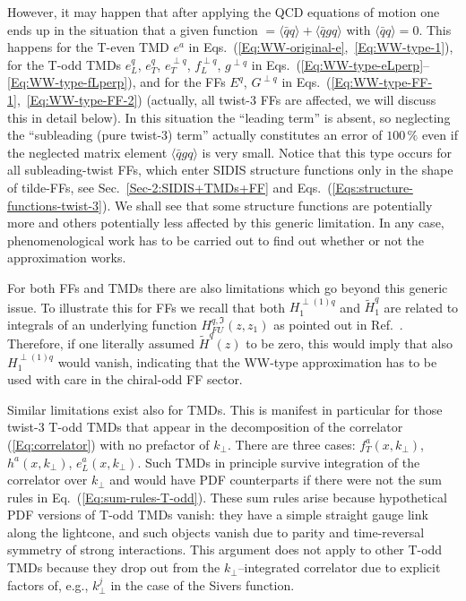 \documentclass[a4paper,11pt]{article}
\newcommand{\la}{\langle}
\newcommand{\ra}{\rangle}
\def\kperp{k_\perp}
\begin{document}
However, it may happen that after applying the QCD equations
of motion one ends up in the situation that a given function
$=\la\bar{q}q\ra + \la\bar{q}gq\ra$ with $\la\bar{q}q\ra = 0$.
This happens for the T-even TMD
	$e^a$ in Eqs.~(\ref{Eq:WW-original-e},~\ref{Eq:WW-type-1}),
for the T-odd TMDs
	$e_L^q$,
	$e_T^q$,
	$e_T^{\perp q}$,
	$f_L^{\perp q}$,
	$g^{\perp q}$ in Eqs.~(\ref{Eq:WW-type-eLperp}--\ref{Eq:WW-type-fLperp}),
and for the FFs
	$E^q$,
	$G^{\perp q}$ in Eqs.~(\ref{Eq:WW-type-FF-1},~\ref{Eq:WW-type-FF-2})
(actually, all twist-3 FFs are affected, we will discuss this in detail below).
In this situation the ``leading term'' is absent, so neglecting the
``subleading (pure twist-3) term'' actually constitutes an error of $100\,\%$
even if the neglected matrix element  $\la\bar{q}gq\ra$ is very small.
Notice that this type occurs for all subleading-twist FFs, which enter
SIDIS structure functions only in the shape of tilde-FFs, see
Sec.~\ref{Sec-2:SIDIS+TMDs+FF} and
Eqs.~(\ref{Eqs:structure-functions-twist-3}).
We shall see that some structure functions are potentially more and
others potentially less affected by this generic limitation. In any
case, phenomenological work has to be carried out to find out whether
or not the approximation works.


For both FFs and TMDs there are also limitations
which go beyond this generic issue. To illustrate this for FFs
we recall that both $H_1^{\perp(1)q}$ and $\tilde H_1^{q}$ are
related to integrals of an underlying function $H_{FU}^{q,\Im}(z,z_1)$
as pointed out in Ref.~\cite{Kanazawa:2015ajw}. Therefore, if one
literally assumed $\tilde H^q(z)$ to be zero, this would imply that
also $H_1^{\perp(1)q}$ would vanish, indicating that the WW-type
approximation has to be used with care in the chiral-odd FF sector.

Similar limitations exist also for TMDs. This is manifest in particular
for those twist-3 T-odd TMDs that appear in the decomposition of the
correlator (\ref{Eq:correlator}) with no prefactor of $\kperp$.
There are three cases: $f_T^a(x,k_\perp)$, $h^a(x,\kperp)$, $e_L^a(x,\kperp)$.
Such TMDs in principle survive integration of the correlator over $\kperp$
and would have PDF counterparts if there were not the sum rules in
Eq.~(\ref{Eq:sum-rules-T-odd}). These sum rules arise because hypothetical
PDF versions of T-odd TMDs vanish: they have a simple straight gauge link
along the lightcone, and such objects vanish due to parity and time-reversal
symmetry of strong interactions. This argument does not apply to other T-odd
TMDs because they drop out from the $\kperp$--integrated correlator due to
explicit factors of, e.g., $\kperp^j$ in the case of the Sivers function.
\end{document}
